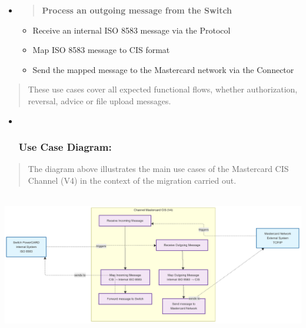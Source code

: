 \documentclass[12pt,a4paper]{report}
\begin{document}
\begin{itemize}
\item
  \begin{quote}
  \textbf{Process an outgoing message from the Switch}
  \end{quote}

  \begin{itemize}
  \item
    Receive an internal ISO 8583 message via the Protocol
  \item
    Map ISO 8583 message to CIS format
  \item
    Send the mapped message to the Mastercard network via the Connector
  \end{itemize}
\end{itemize}

\begin{quote}
These use cases cover all expected functional flows, whether
authorization, reversal, advice or file upload messages.
\end{quote}

\begin{itemize}
\item ~
  \hypertarget{use-case-diagram-1}{%
  \subsubsection{\texorpdfstring{\textbf{Use Case
  Diagram:}}{Use Case Diagram:}}\label{use-case-diagram-1}}
\end{itemize}

\begin{quote}
The diagram above illustrates the main use cases of the Mastercard CIS
Channel (V4) in the context of the migration carried out.
\end{quote}

\includegraphics[width=6.25436in,height=2.4724in]{vertopal_d1b0b2209edd4c6aa8254f57daa0953b/media/image35.png}
\end{document}
